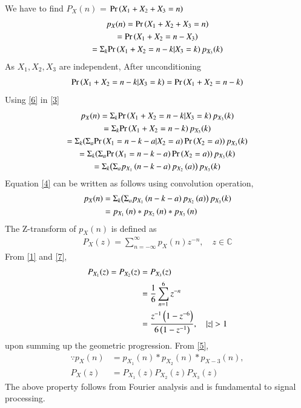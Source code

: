 We have to find $P_X(n)$ = $\Pr\left(X_1+X_2+X_3=n\right)$
\begin{multline}
    p_X(n)=\pr{X_1+X_2+X_3=n}\\
   =\pr{X_1+X_2=n-X_3}\\
    =\Sigma_{k}{\pr{X_1+X_2=n-k|X_3=k}p_{X_3}(k)}\label{3}
\end{multline}
As $X_1,X_2,X_3$ are independent, After unconditioning
\begin{align}
    \pr{X_1+X_2=n-k|X_3=k}=\pr{X_1+X_2=n-k}\label{6}
\end{align}
Using \eqref{6} in \eqref{3}
\begin{multline}
    p_X(n)=\Sigma_{k}{\pr{X_1+X_2=n-k|X_3=k}p_{X_3}(k)}\\
    =\Sigma_{k}{\pr{X_1+X_2=n-k}p_{X_3}(k)}\\
    =\Sigma_{k}{\brak{\Sigma_{a}{\pr{X_1=n-k-a|X_2=a}\pr{X_2=a}}}p_{X_3}(k)}\\
    =\Sigma_{k}{\brak{\Sigma_{a}{\pr{X_1=n-k-a}\pr{X_2=a}}}p_{X_3}(k)}\\
    =\Sigma_{k}{\brak{\Sigma_{a}{p_{X_1}\brak{n-k-a}p_{X_2}\brak{a}}}p_{X_3}(k)}\label{4}
\end{multline}
Equation \eqref{4} can be written as follows using convolution operation,
\begin{align}
    \nonumber p_X(n)&=\Sigma_{k}{\brak{\Sigma_{a}{p_{X_1}\brak{n-k-a}p_{X_2}\brak{a}}}p_{X_3}(k)}\\
    &=p_{X_1}\brak{n}*p_{X_2}\brak{n}*p_{X_3}\brak{n}\label{5}
\end{align}
The Z-transform of $p_X(n)$ is defined as
\begin{align}
P_X(z) = \sum_{n = -\infty}^{\infty}p_X(n)z^{-n}, \quad z \in \mathbb{C}
\label{7}
\end{align}
%
From \eqref{1} and \eqref{7}, 
\begin{align}
\nonumber P_{X_1}(z) =P_{X_2}(z)&=P_{X_3}(z)\\
&= \frac{1}{6}\sum_{n = 1}^{6}z^{-n}
\\
&=\frac{z^{-1}\brak{1-z^{-6}}}{6\brak{1-z^{-1}}}, \quad \abs{z} > 1
\label{8}
\end{align}
upon summing up the geometric progression. 
From \eqref{5},
\begin{align}
\because p_X(n) &= p_{X_1}(n)*p_{X_2}(n)*p_{X-3}(n),
\\
P_X(z) &= P_{X_1}(z) P_{X_2}(z)P_{X_3}(z)
\label{9}
\end{align}
The above property follows from Fourier analysis and is fundamental to signal processing.\\
